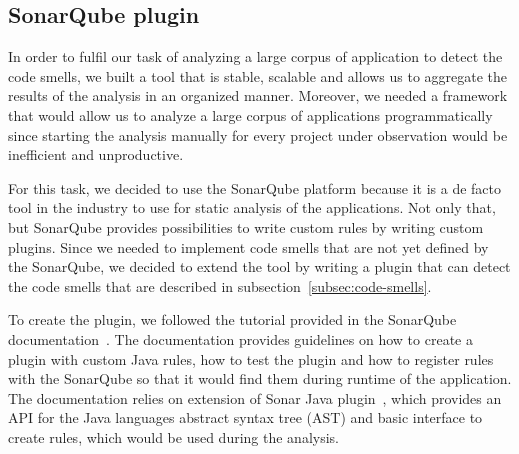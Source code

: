 
\subsection{SonarQube plugin}\label{subsec:sonarqube-plugin}

In order to fulfil our task of analyzing a large corpus of application to detect the code smells,
we built a tool that is stable, scalable and allows us to aggregate the results of the
analysis in an organized manner.
Moreover, we needed a framework that would allow us to analyze a large corpus of applications programmatically since starting
the analysis manually for every project under observation would be inefficient and unproductive.

For this task, we decided to use the SonarQube platform because it is a de facto tool in the industry to use
for static analysis of the applications.
Not only that, but SonarQube provides possibilities to write custom rules by writing custom plugins.
Since we needed to implement code smells that are not yet defined by the SonarQube, we decided to extend
the tool by writing a plugin that can detect the code smells that are described in subsection~\ref{subsec:code-smells}.


To create the plugin, we followed the tutorial provided in the SonarQube documentation~\cite{sonar_plugin_tutorial}.
The documentation provides guidelines on how to create a plugin with custom Java rules, how to test the plugin and
how to register rules with the SonarQube so that it would find them during runtime of the application.
The documentation relies on extension of Sonar Java plugin~\cite{sonar_java_plugin}, which provides an API
for the Java languages abstract syntax tree (AST) and basic interface to create rules, which would be used
during the analysis.


